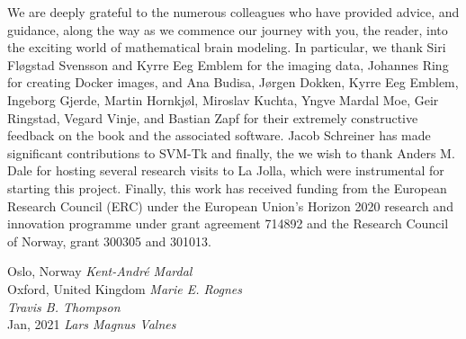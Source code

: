 We are deeply grateful to the numerous colleagues who have provided
advice, and guidance, along the way as we commence our journey with
you, the reader, into the exciting world of mathematical brain
modeling. In particular, we thank Siri Fl\o gstad Svensson and Kyrre
Eeg Emblem for the imaging data, Johannes Ring for creating Docker
images, and Ana Budisa, J\o rgen Dokken, Kyrre Eeg Emblem, Ingeborg
Gjerde, Martin Hornkj\o l, Miroslav Kuchta, Yngve Mardal Moe, Geir
Ringstad, Vegard Vinje, and Bastian Zapf for their extremely
constructive feedback on the book and the associated software.  Jacob
Schreiner has made significant contributions to SVM-Tk and finally,
the we wish to thank Anders M. Dale for hosting several research
visits to La Jolla, which were instrumental for starting this project.
Finally, this work has received funding from the European Research 
Council (ERC) under the European Union's Horizon 2020 research and 
innovation programme under grant agreement 714892 
and the Research Council of Norway, grant 300305 and 301013. 


\vspace{\baselineskip}
\begin{flushright}\noindent
Oslo, Norway \hfill {\it Kent-Andr\'e Mardal}\\ 
Oxford, United Kingdom   \hfill {\it Marie E. Rognes}\\ 
             \hfill {\it Travis B. Thompson}\\ 
Jan, 2021    \hfill {\it Lars Magnus Valnes}\\ 
\end{flushright}


